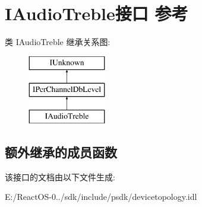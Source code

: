 \hypertarget{interface_i_audio_treble}{}\section{I\+Audio\+Treble接口 参考}
\label{interface_i_audio_treble}
类 I\+Audio\+Treble 继承关系图\+:\begin{figure}[H]
\begin{center}
\leavevmode
\includegraphics[height=3.000000cm]{interface_i_audio_treble}
\end{center}
\end{figure}
\subsection*{额外继承的成员函数}


该接口的文档由以下文件生成\+:\begin{DoxyCompactItemize}
\item 
E\+:/\+React\+O\+S-\/0../sdk/include/psdk/devicetopology.\+idl\end{DoxyCompactItemize}
